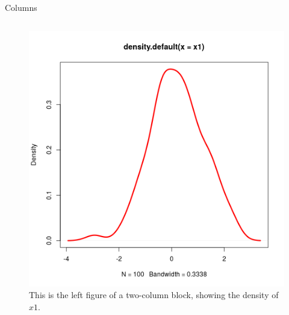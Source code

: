 \documentclass[final]{beamer}
\begin{document}
\begin{frame}[fragile,label={sec:org48aedac}]{}
\begin{columns}
\begin{column}[t]{0.45\columnwidth}
\begin{block}{Columns}
\begin{columns}
\begin{column}[T]{0.48\columnwidth}
\captionsetup{justification=justified,width=.85\linewidth}
\begin{figure}[htbp]
\centering
\includegraphics[width=.9\linewidth]{4l.png}
\caption{\label{fig:orgf1fb0dc}
This is the left figure of a two-column block, showing the density of \(x1\).}
\end{figure}
\end{column}


\end{columns}
\end{block}
\end{column}
\end{columns}
\end{frame}
\end{document}
